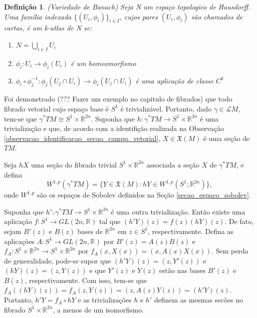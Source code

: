 \documentclass[12pt]{book}
\newtheorem{definicao}[teorema]{Definição}
\newcommand{\campossuaves}[1]{\mathfrak{X}(#1)}
\newcommand{\circulo}{S^{1}}
\newcommand{\espacosobolev}[1]{W^{1,p}(#1)}
\newcommand{\espacosobolevcontradominio}[2]{W^{1,p}(#1;#2)}
\newcommand{\generalgroup}[2]{GL(#1, #2)}
\newcommand{\generalgroupreal}[1]{\generalgroup{#1}{\real{}}}
\newcommand{\pullbackfibradotangente}[2]{#1^{*}T#2}
\newcommand{\pullbackfibradotangenteM}[1]{\pullbackfibradotangente{#1}{M}}
\newcommand{\real}[1]{\mathbb{R}^{#1}}
\newcommand{\lacocontrateis}{\mathcal{L}M}
\newcommand{\vermelho}[1]{{\color{red}#1}}
\begin{document}
	\begin{definicao}
		(Variedade de Banach) Seja N um espaço topologico de Hausdorff. Uma família indexada $\{(U_{i}, \phi_{i})\}_{i \in I}$, cujos pares $(U_{i}, \phi_{i})$ são chamados de cartas, é um k-atlas de N se:
		\begin{enumerate}
			\item $N=\bigcup_{i\in I} U_{i}$
			\item $\phi_{i}:U_{i} \to \phi_{i}(U_{i})$ é um homeomorfismo
			\item $\phi_{i}\circ \phi_{j}^{-1}: \phi_{j}(U_{j}\cap U_{i}) \to \phi_{i}(U_{j}\cap U_{i}) $ é uma aplicação de classe $C^{k}$
		\end{enumerate}
	\end{definicao}
	
	Foi demonstrado \vermelho{(??? Fazer um exemplo no capitulo de fibrados)} que todo fibrado vetorial cujo espaço base é $\circulo$ é trivializável. Portanto, dado $\gamma\in\lacocontrateis$, tem-se que $\pullbackfibradotangenteM{\gamma} \cong \circulo\times \real{2n}$. Suponha que $h:\pullbackfibradotangenteM{\gamma} \to \circulo\times \real{2n}$ é uma trivialização e que, de acordo com a identifição realizada na Observação \ref{observacao_identificacao_secao_campo_vetorial}, $X \in \campossuaves{M}$ é uma seção de $TM$. 
	
	Seja $hX$ uma seção do fibrado trivial $\circulo\times \real{2n}$ associada a seção $X$ de $\pullbackfibradotangenteM{\gamma}$, e defina 
	$$
	\espacosobolev{\pullbackfibradotangenteM{\gamma}} = \{Y \in \campossuaves{M} : hY\in \espacosobolevcontradominio{\circulo}{\real{2n}}\},
	$$ 
	onde $W^{1,p}$ são os espaços de Sobolev definidos na Seção \ref{secao_espaco_sobolev}.
	
	Suponha que $h':\pullbackfibradotangenteM{\gamma} \to \circulo\times \real{2n}$ é uma outra trivialização. Então existe uma aplicação $f:\circulo\to \generalgroupreal{2n}$ tal que $(h'Y)(z) = f(z)(hY)(z)$. De fato, sejam $B'(z)$ e $B(z)$ 
	bases de $\real{2n}$ em $z\in \circulo$, respectivamente. Defina as aplicações $A:\circulo \to \generalgroupreal{2n}$ por $B'(z)=A(z)B(z)$ e $f_{A}:\circulo\times \real{2n}\to \circulo\times \real{2n}$ por $f_{A}(x, X(x))=(x, A(x)X(x))$.  Sem perda de generalidade, pode-se supor que $(h'Y)(z) = (z, Y'(z))$ e $(hY)(z) = (z, Y(z))$ e que $Y'(z)$ e $Y(z)$ estão nas bases $B'(z)$ e $B(z)$, respectivamente. Com isso, tem-se que $f_{A}((hY)(z)) = f_{A}(z, Y(z)) = (z, A(z)Y(z)) = (h'Y)(z)$. Portanto, $h'Y = f_{A}\circ hY$ e as trivializações $h$ e $h'$ definem as mesmas secões no fibrado $\circulo\times \real{2n}$, a menos de um isomorfismo.
	
\end{document}
